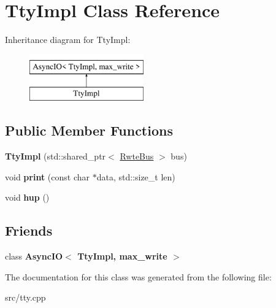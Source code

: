 \hypertarget{classTtyImpl}{}\section{Tty\+Impl Class Reference}
\label{classTtyImpl}
Inheritance diagram for Tty\+Impl\+:\begin{figure}[H]
\begin{center}
\leavevmode
\includegraphics[height=2.000000cm]{classTtyImpl}
\end{center}
\end{figure}
\subsection*{Public Member Functions}
\begin{DoxyCompactItemize}
\item 
\mbox{\label{classTtyImpl_ad2853e9b9faf533e72b9cb94a93aba88}} 
{\bfseries Tty\+Impl} (std\+::shared\+\_\+ptr$<$ \mbox{\hyperlink{classBus}{Rwte\+Bus}} $>$ bus)
\item 
\mbox{\label{classTtyImpl_a1c4eee64f7031999a002658e347700a2}} 
void {\bfseries print} (const char $\ast$data, std\+::size\+\_\+t len)
\item 
\mbox{\label{classTtyImpl_aa6d4ebb233b963e32e010d47461905f4}} 
void {\bfseries hup} ()
\end{DoxyCompactItemize}
\subsection*{Friends}
\begin{DoxyCompactItemize}
\item 
\mbox{\label{classTtyImpl_ac07d904a769e411de0b805d3578101bc}} 
class {\bfseries Async\+I\+O$<$ Tty\+Impl, max\+\_\+write $>$}
\end{DoxyCompactItemize}


The documentation for this class was generated from the following file\+:\begin{DoxyCompactItemize}
\item 
src/tty.\+cpp\end{DoxyCompactItemize}
